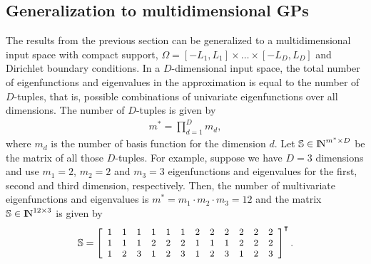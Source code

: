 \subsection{Generalization to multidimensional GPs} \label{sec_method_multi}

The results from the previous section can be generalized to a multidimensional input space with compact support, $\Omega=[-L_1,L_1] \times \dots \times [-L_D,L_D]$ and Dirichlet boundary conditions. 
In a $D$-dimensional input space, the total number of eigenfunctions and eigenvalues in the approximation is equal to the number of $D$-tuples, that is, possible combinations of univariate eigenfunctions over all dimensions. The number of $D$-tuples is given by 
%
\begin{align} \label{eq_m_multi}
m^{\ast} = \prod_{d=1}^{D} m_d,
\end{align}
%
where $m_d$ is the number of basis function for the dimension $d$. Let $\mathbb{S}\in {\rm I\!N}^{m^{\ast} \times D}$ be the matrix of all those $D$-tuples. For example, suppose we have $D=3$ dimensions and use $m_{1}=2$, $m_{2}=2$ and $m_{3}=3$ eigenfunctions and eigenvalues for the first, second and third dimension, respectively. Then, the number of multivariate eigenfunctions and eigenvalues is $m^{\ast} = m_{1} \cdot m_{2} \cdot m_{3} = 12$ and the matrix $\mathbb{S}\in {\rm I\!N}^{12 \times 3}$ is given by
%
%
\begin{align}\small
\mathbb{S}=
\left[ {\begin{array}{cccccccccccc}
1 & 1 & 1 & 1 & 1 & 1 & 2 & 2 & 2 & 2 & 2 & 2 \\
1 & 1 & 1 & 2 & 2 & 2 & 1 & 1 & 1 & 2 & 2 & 2 \\
1 & 2 & 3 & 1 & 2 & 3 & 1 & 2 & 3 & 1 & 2 & 3
\end{array} } \right]^\intercal.
\end{align} 

